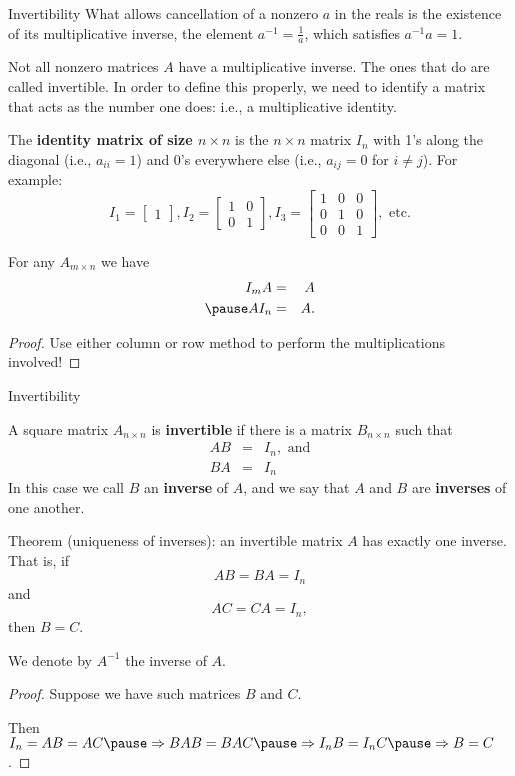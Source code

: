 \begin{frame}{Invertibility}\footnotesize
What allows cancellation of a nonzero $a$ in the reals is the existence of its \alert{multiplicative inverse}, the element $a^{-1}=\frac{1}{a}$, which satisfies $a^{-1}a=1$. 

\bpause Not all nonzero matrices $A$ have a multiplicative inverse. The ones that do are called \alert{invertible}. In order to define this properly, we need to identify a matrix that acts as the number one does: i.e., a \alert{multiplicative identity}.  
\pause
\begin{definition}
The {\bf identity matrix of size $n\times n$} is the $n\times n$ matrix $I_n$ with 1's along the diagonal (i.e., $a_{ii}=1$) and 0's everywhere else (i.e., $a_{ij}=0$ for $i\ne j$). For example:
\[
I_1=\begin{bmatrix} 1\end{bmatrix}, I_2=\begin{bmatrix} 1&0\\
0&1\end{bmatrix}, I_3=\begin{bmatrix}1&0&0\\
0&1&0\\ 0&0&1\end{bmatrix}, \text{ etc.}
\]

\end{definition} 
\pause\begin{theorem}
For any $A_{m\times n}$ we have
\begin{eqnarray*}
I_mA&=&A\\
\pause AI_n&=&A.
\end{eqnarray*}
\end{theorem}
\pause\begin{proof}
Use either column or row method to perform the multiplications involved! 
\end{proof}
\end{frame}
\begin{frame}{Invertibility}\footnotesize
\begin{definition}
A square matrix $A_{n\times n}$ is {\bf invertible} if there is a matrix $B_{n\times n}$ such that 
\begin{eqnarray*}
AB&=&I_n, \text{ and}\\
BA&=&I_n
\end{eqnarray*} 
In this case we call $B$ an {\bf inverse} of $A$, and we say that $A$ and $B$ are {\bf inverses} of one another. 
\end{definition}
\bpause
\alert{Theorem (uniqueness of inverses):} 
an invertible matrix $A$ has exactly one inverse. That is, if 
\[
AB=BA=I_n
\]
and 
\[
AC=CA=I_n,
\]
then $B=C$. 

We denote by $A^{-1}$ the inverse of $A$. 

\pause
\begin{proof}
Suppose we have such matrices $B$ and $C$. 

Then $I_n=AB=AC\pause\Rightarrow BAB=BAC\pause\Rightarrow I_nB=I_nC\pause\Rightarrow B=C$.
\end{proof}
\end{frame}
